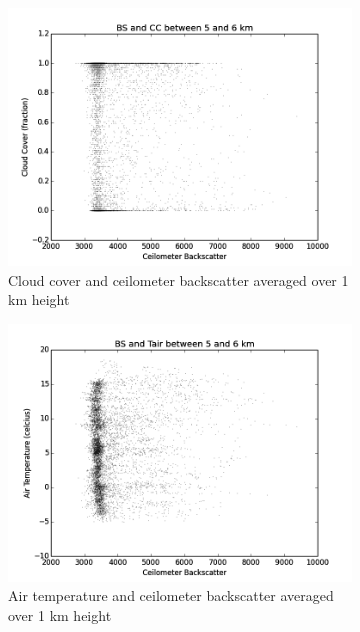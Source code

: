 \documentclass[a4paper,titlepage, twoside]{report}
\begin{document}
\begin{figure}
\centering
\begin{subfigure}{0.48\textwidth}
\includegraphics[width=\textwidth]{BS5_CC.png}
\caption{Cloud cover and ceilometer backscatter averaged over 1 km height}
\end{subfigure}
\hfill
\begin{subfigure}{0.48\textwidth}
\includegraphics[width=\textwidth]{BS5_Tair.png}
\caption{Air temperature and ceilometer backscatter averaged over 1 km height}
\end{subfigure}
\\
\begin{subfigure}{0.48\textwidth}

\end{subfigure}
\end{figure}
\end{document}
